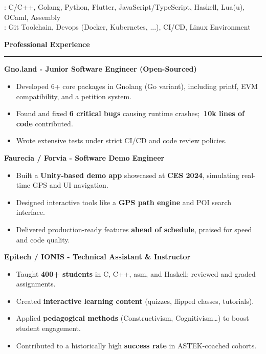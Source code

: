 \documentclass[9pt]{extarticle}
\begin{document}
\hspace*{5pt}{\bfseries Technical}: C/C++, Golang, Python, Flutter, JavaScript/TypeScript, Haskell, Lua(u), OCaml, Assembly
\\
\hspace*{5pt}{\bfseries Other}: Git Toolchain, Devops (Docker, Kubernetes, ...), CI/CD, Linux Environment

\par\vspace{5pt}


{\large\bfseries Professional Experience}
\par\vspace{-8pt}
\rule{\linewidth}{0.4pt}
\par\vspace{5pt}

{\bfseries Gno.land - Junior Software Engineer (Open-Sourced)}
\begin{itemize}[noitemsep, topsep=0pt]
	\item Developed 6+ core packages in Gnolang (Go variant), including printf, EVM compatibility, and a petition system.
	\item Found and fixed {\bfseries 6 critical bugs} causing runtime crashes;{\bfseries ~10k lines of code} contributed.
	\item Wrote extensive tests under strict CI/CD and code review policies.
\end{itemize}

\par\vspace{5pt}

{\bfseries Faurecia / Forvia - Software Demo Engineer}
\begin{itemize}[noitemsep, topsep=0pt]
	\item Built a {\bfseries Unity-based demo app} showcased at {\bfseries CES 2024}, simulating real-time GPS and UI navigation.
	\item Designed interactive tools like a {\bfseries GPS path engine} and POI search interface.
	\item Delivered production-ready features {\bfseries ahead of schedule}, praised for speed and code quality.
\end{itemize}

\par\vspace{5pt}

{\bfseries Epitech / IONIS - Technical Assistant \& Instructor}
\begin{itemize}[noitemsep, topsep=0pt]
	\item Taught {\bfseries 400+ students} in C, C++, asm, and Haskell; reviewed and graded assignments.
	\item Created {\bfseries interactive learning content} (quizzes, flipped classes, tutorials).
	\item Applied {\bfseries pedagogical methods} (Constructivism, Cognitivism…) to boost student engagement.
	\item Contributed to a historically high {\bfseries success rate} in ASTEK-coached cohorts.
\end{itemize}
\end{document}
